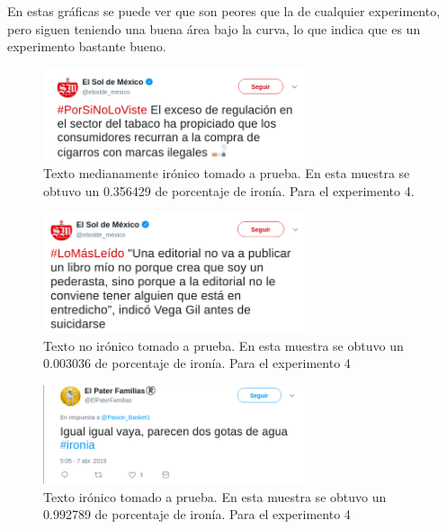 		  \par En estas gráficas se puede ver que son peores que la de cualquier experimento, pero siguen teniendo una buena área bajo la curva, lo que indica que es un experimento bastante bueno.
	
	\begin{figure}
	       \centering
	       \includegraphics[width=0.7\textwidth]{imagenes/ironia3.png}
	       \caption{Texto medianamente irónico tomado a prueba. En esta muestra se obtuvo un 0.356429 de porcentaje de ironía. Para el experimento 4.} %
	       \label{fig:ironyTest3}
	   \end{figure}
	   
	   \begin{figure}
	       \centering
	       \includegraphics[width=0.7\textwidth]{imagenes/ironia4.png}
	       \caption{Texto no irónico tomado a prueba. En esta muestra se obtuvo un 0.003036 de porcentaje de ironía. Para el experimento 4} %
	       \label{fig:ironyTest4}
	   \end{figure}
	   
	   \begin{figure}
	       \centering
	       \includegraphics[width=0.7\textwidth]{imagenes/ironia1.png}
	       \caption{Texto irónico tomado a prueba. En esta muestra se obtuvo un 0.992789 de porcentaje de ironía. Para el experimento 4} %
	       \label{fig:ironyTest5}
	   \end{figure}
	
